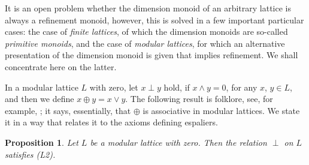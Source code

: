 \documentclass[psamsfonts,reqno]{memo-l}
\theoremstyle{plain}
\newtheorem{proposition}[lemma]{Proposition}
\theoremstyle{definition}
\theoremstyle{remark}
\numberwithin{equation}{section}
\begin{document}
It is an open problem whether the dimension monoid of an arbitrary lattice is
always a refinement monoid, however, this is solved
in a few important particular cases: the case of \emph{finite lattices}, of
which the dimension monoids are so-called \emph{primitive monoids}, and the
case of \emph{modular lattices}, for which an alternative presentation of
the dimension monoid is given that implies refinement. We shall concentrate
here on the latter.

In a modular lattice $L$ with zero, let $x\perp y$ hold, if $x\wedge y=0$,
for any $x$, $y\in L$, and then we define $x\oplus y=x\vee y$. The following
result is folklore, see, for example,
\cite[Proposition~8.1]{WDim}; it says, essentially, that $\oplus$ is
associative in modular lattices. We state it in a way that relates it to
the axioms defining espaliers.

\begin{proposition}\label{P:oplL2}
Let $L$ be a modular lattice with zero.
 Then the relation $\perp$ on $L$
satisfies \textup{(L2)}.
\end{proposition}
\end{document}
